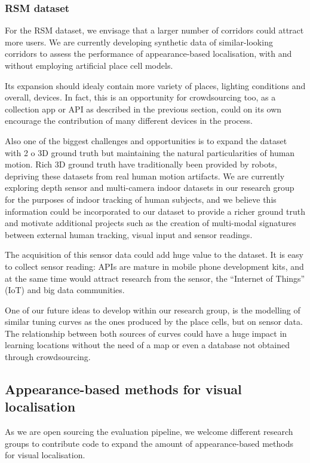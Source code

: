 \subsubsection{RSM dataset}

For the RSM dataset, we envisage that a larger number of corridors could attract more users. We are currently developing synthetic data of similar-looking corridors to assess the performance of appearance-based localisation, with and without employing artificial place cell models.

Its expansion should idealy contain more variety of places, lighting conditions and overall, devices. In fact, this is an opportunity for crowdsourcing too, as a collection app or API as described in the previous section, could on its own encourage the contribution of many different devices in the process.

Also one of the biggest challenges and opportunities is to expand the dataset with 2 o 3D ground truth but maintaining the natural particularities of human motion. Rich 3D ground truth have traditionally been provided by robots, depriving these datasets from real human motion artifacts. We are currently exploring depth sensor and multi-camera indoor datasets in our research group for the purposes of indoor tracking of human subjects, and we believe this information could be incorporated to our dataset to provide a richer ground truth and motivate additional projects such as the creation of multi-modal signatures between external human tracking, visual input and sensor readings.

The acquisition of this sensor data could add huge value to the dataset. It is easy to collect sensor reading: APIs are mature in mobile phone development kits, and at the same time would attract research from the sensor, the ``Internet of Things'' (IoT) and big data communities.

One of our future ideas to develop within our research group, is the modelling of similar tuning curves as the ones produced by the place cells, but on sensor data. The relationship between both sources of curves could have a huge impact in learning locations without the need of a map or even a database not obtained through crowdsourcing.

\subsection{Appearance-based methods for visual localisation}
As we are open sourcing the evaluation pipeline, we welcome different research groups to contribute code to expand the amount of appearance-based methods for visual localisation.

